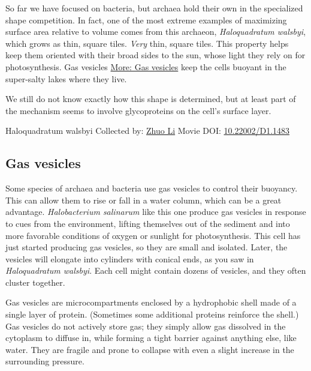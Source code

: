 \documentclass[]{tufte-book}
\begin{document}
So far we have focused on bacteria, but archaea hold their own in the specialized shape competition. In fact, one of the most extreme examples of maximizing surface area relative to volume comes from this archaeon, \emph{Haloquadratum walsbyi}, which grows as thin, square tiles. \emph{Very} thin, square tiles. This property helps keep them oriented with their broad sides to the sun, whose light they rely on for photosynthesis. Gas vesicles \protect\hyperlink{Gas_vesicles}{More: Gas vesicles} keep the cells buoyant in the super-salty lakes where they live.

We still do not know exactly how this shape is determined, but at least part of the mechanism seems to involve glycoproteins on the cell's surface layer.



\hypertarget{htmlwidget-afbfcfc898716e9dc0a3}{}

\label{fig:3-7}Haloquadratum walsbyi Collected by: \protect\hyperlink{zhuo_li}{Zhuo Li} Movie DOI: \href{https://doi.org/10.22002/D1.1483}{10.22002/D1.1483}

\hypertarget{Gas_vesicles}{%
\subsection{Gas vesicles}\label{Gas_vesicles}}

Some species of archaea and bacteria use gas vesicles to control their buoyancy. This can allow them to rise or fall in a water column, which can be a great advantage. \emph{Halobacterium salinarum} like this one produce gas vesicles in response to cues from the environment, lifting themselves out of the sediment and into more favorable conditions of oxygen or sunlight for photosynthesis. This cell has just started producing gas vesicles, so they are small and isolated. Later, the vesicles will elongate into cylinders with conical ends, as you saw in \emph{Haloquadratum walsbyi}. Each cell might contain dozens of vesicles, and they often cluster together.

Gas vesicles are microcompartments enclosed by a hydrophobic shell made of a single layer of protein. (Sometimes some additional proteins reinforce the shell.) Gas vesicles do not actively store gas; they simply allow gas dissolved in the cytoplasm to diffuse in, while forming a tight barrier against anything else, like water. They are fragile and prone to collapse with even a slight increase in the surrounding pressure.
\end{document}
